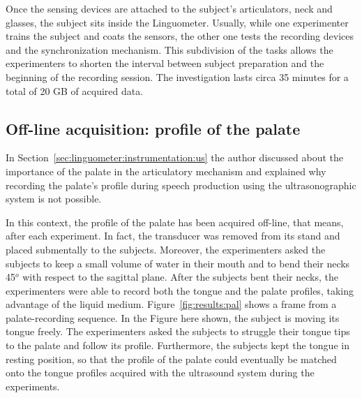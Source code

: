 Once the sensing devices are attached to the subject's articulators, neck and
glasses, the subject sits inside the Linguometer.
Usually, while one experimenter trains the subject and coats the sensors, the
other one tests the recording devices and the synchronization mechanism.
This subdivision of the tasks allows the experimenters to shorten the interval
between subject preparation and the beginning of the recording session.
The investigation lasts circa 35 minutes
for a total of 20 GB of acquired data.

\subsection{Off-line acquisition: profile of the palate}
\label{sec:experiments:palate}
In Section~\ref{sec:linguometer:instrumentation:us} 
%
%
the author discussed about the
importance of the palate in the articulatory mechanism and 
explained why recording the palate's profile during speech production using 
the ultrasonographic system is not possible.

In this context, the profile of the palate has been acquired off-line, that
means, after each experiment. 
In fact, the transducer was removed from its stand and placed submentally to the
subjects. 
Moreover, the experimenters asked the subjects to keep a small volume of water
in their mouth and to bend their necks 45$^o$ with respect to the sagittal
plane.
After the subjects bent their necks, the experimenters were able to record both
the tongue and the palate profiles, taking advantage of the liquid medium.
Figure~\ref{fig:results:pal} shows a frame from a palate-recording sequence.
In the Figure here shown, the subject is moving its tongue freely. 
The experimenters asked the subjects to struggle their tongue tips to the
palate and follow its profile.
Furthermore, the subjects kept the tongue in resting position, so that the
profile of the palate could eventually be matched onto the tongue profiles
acquired with the ultrasound system during the experiments.



